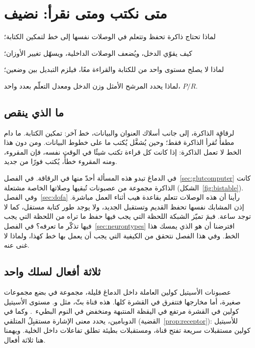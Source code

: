 \chapter{متى نكتب ومتى نقرأ: نضيف }
\label{sec:acet}
\begin{chaptergoals}
\item لماذا تحتاج ذاكرة تحفظ وتتعلم في الوصلات نفسها إلى خط لتمكين الكتابة؛
\item كيف يقوّي  الدخل، ويُضعف الوصلات الداخلية، ويسهّل تغيير الأوزان؛
\item لماذا لا يصلح مستوى واحد من  للكتابة والقراءة معًا، فيلزم التبديل بين وضعين؛
\item لماذا يحدد المرشح الأمثل وزن الدخل ومعدل التعلّم بعدد واحد، $P/R$.
\end{chaptergoals}

\section{ما الذي ينقص}

لرقاقة الذاكرة، إلى جانب أسلاك العنوان والبيانات، خط آخر: تمكين الكتابة. ما دام مطفأً تُقرأ الذاكرة فقط؛ وحين يُشغَّل يُكتب ما على خطوط البيانات. ومن دون هذا الخط لا تعمل الذاكرة: إذا كانت كل قراءة تكتب شيئًا في الوقت نفسه، فإن المقروء، ومنه المقروء خطأً، يُكتب فورًا من جديد.

في الدماغ تبدو هذه المسألة أحدّ منها في الرقاقة. في الفصل~\ref{sec:glutcomputer} كانت الذاكرة مجموعة من عصبونات  تُبقيها وصلاتها الخاصة مشتعلة (الشكل~\ref{fig:bistable}). وفي الفصل~\ref{sec:dofa} رأينا أن هذه الوصلات تتعلم بقاعدة هيب أثناء العمل مباشرة. إذن المشابك نفسها تحفظ القديم وتستقبل الجديد، ولا يوجد طور كتابة مستقل، كما لا توجد ساعة. فبمَ تميّز الشبكة اللحظة التي يجب فيها حفظ ما تراه من اللحظة التي يجب فيها تذكّر ما تعرفه؟ في الفصل~\ref{sec:neurontypes} افترضنا أن  هو الذي يمسك هذا الخط. وفي هذا الفصل نتحقق من الكيفية التي يجب أن يعمل بها خط كهذا، ولماذا لا غنى عنه.

\section{ثلاثة أفعال لسلك واحد}

عصبونات الأسيتيل كولين العاملة داخل الدماغ قليلة، مجموعة في بضع مجموعات صغيرة، أما مخارجها فتتفرق في القشرة كلها. هذه قناة بثّ، مثل  و. مستوى الأسيتيل كولين في القشرة مرتفع في اليقظة المنتبهة ومنخفض في النوم البطيء~\cite{Hasselmo1999}. وكما في الدوبامين، يحدد معنى الإشارة مستقبِلُ المتلقي (القضية~\ref{prop:receptor}): للأسيتيل كولين مستقبلات سريعة تفتح قناة، ومستقبلات بطيئة تطلق تفاعلات داخل الخلية. ويهمنا هنا ثلاثة أفعال.

